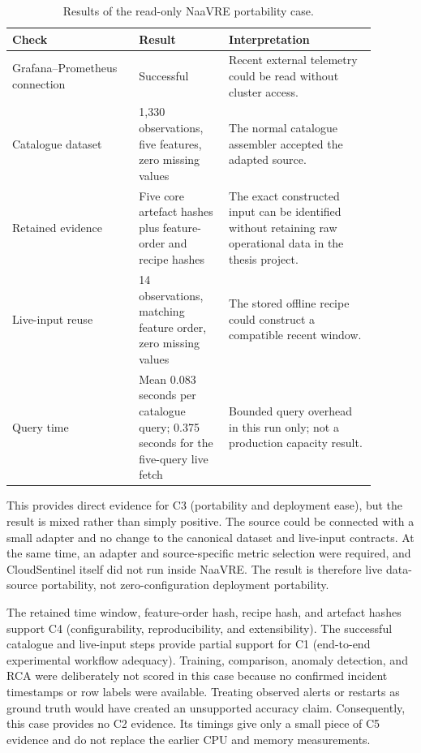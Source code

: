 \begin{table}[H]
    \centering
    \small
    \caption{Results of the read-only NaaVRE portability case.}
    \label{tab:h9-naavre-results}
    \begin{tabular}{|p{0.31\linewidth}|p{0.22\linewidth}|p{0.36\linewidth}|}
        \hline
        Check & Result & Interpretation \\
        \hline
        Grafana--Prometheus connection & Successful & Recent external telemetry could be read without cluster access. \\
        \hline
        Catalogue dataset & 1,330 observations, five features, zero missing values & The normal catalogue assembler accepted the adapted source. \\
        \hline
        Retained evidence & Five core artefact hashes plus feature-order and recipe hashes & The exact constructed input can be identified without retaining raw operational data in the thesis project. \\
        \hline
        Live-input reuse & 14 observations, matching feature order, zero missing values & The stored offline recipe could construct a compatible recent window. \\
        \hline
        Query time & Mean 0.083 seconds per catalogue query; 0.375 seconds for the five-query live fetch & Bounded query overhead in this run only; not a production capacity result. \\
        \hline
    \end{tabular}
\end{table}

This provides direct evidence for C3 (portability and deployment ease), but the result is mixed rather than simply positive. The source could be connected with a small adapter and no change to the canonical dataset and live-input contracts. At the same time, an adapter and source-specific metric selection were required, and CloudSentinel itself did not run inside NaaVRE. The result is therefore live data-source portability, not zero-configuration deployment portability.

The retained time window, feature-order hash, recipe hash, and artefact hashes support C4 (configurability, reproducibility, and extensibility). The successful catalogue and live-input steps provide partial support for C1 (end-to-end experimental workflow adequacy). Training, comparison, anomaly detection, and RCA were deliberately not scored in this case because no confirmed incident timestamps or row labels were available. Treating observed alerts or restarts as ground truth would have created an unsupported accuracy claim. Consequently, this case provides no C2 evidence. Its timings give only a small piece of C5 evidence and do not replace the earlier CPU and memory measurements.


